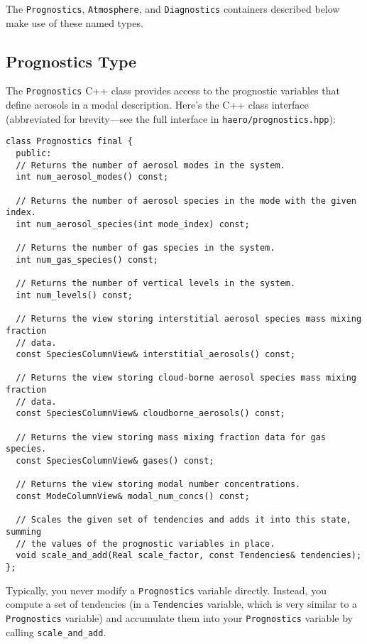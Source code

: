 The \texttt{Prognostics}, \texttt{Atmosphere}, and \texttt{Diagnostics} containers
described below make use of these named types.

\subsection{Prognostics Type}

The \texttt{Prognostics} C++ class provides access to the prognostic variables
that define aerosols in a modal description. Here's the C++ class interface
(abbreviated for brevity---see the full interface in \texttt{haero/prognostics.hpp}):

\begin{lstlisting}
class Prognostics final {
  public:
  // Returns the number of aerosol modes in the system.
  int num_aerosol_modes() const;

  // Returns the number of aerosol species in the mode with the given index.
  int num_aerosol_species(int mode_index) const;

  // Returns the number of gas species in the system.
  int num_gas_species() const;

  // Returns the number of vertical levels in the system.
  int num_levels() const;

  // Returns the view storing interstitial aerosol species mass mixing fraction
  // data.
  const SpeciesColumnView& interstitial_aerosols() const;

  // Returns the view storing cloud-borne aerosol species mass mixing fraction
  // data.
  const SpeciesColumnView& cloudborne_aerosols() const;

  // Returns the view storing mass mixing fraction data for gas species.
  const SpeciesColumnView& gases() const;

  // Returns the view storing modal number concentrations.
  const ModeColumnView& modal_num_concs() const;

  // Scales the given set of tendencies and adds it into this state, summing
  // the values of the prognostic variables in place.
  void scale_and_add(Real scale_factor, const Tendencies& tendencies);
};
\end{lstlisting}

Typically, you never modify a \texttt{Prognostics} variable directly. Instead, you
compute a set of tendencies (in a \texttt{Tendencies} variable, which is very
similar to a \texttt{Prognostics} variable) and accumulate them into your
\texttt{Prognostics} variable by calling \texttt{scale\_and\_add}.

